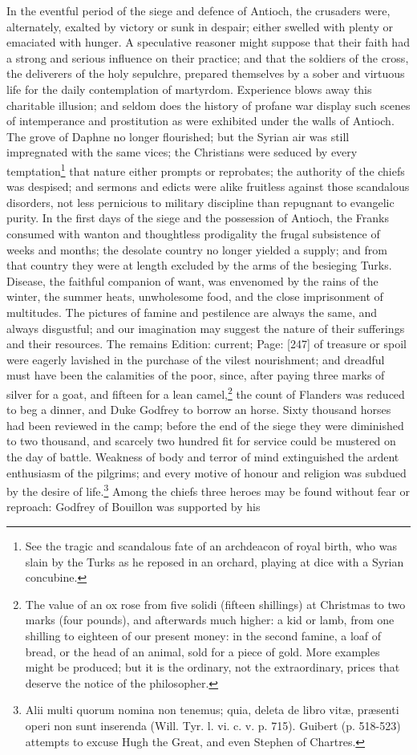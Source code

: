 In the eventful period of the siege and defence of Antioch, the crusaders were, alternately, exalted by victory or sunk in despair; either swelled with plenty or emaciated with hunger. A speculative reasoner might suppose that their faith had a strong and serious influence on their practice; and that the soldiers of the cross, the deliverers of the holy sepulchre, prepared themselves by a sober and virtuous life for the daily contemplation of martyrdom. Experience blows away this charitable illusion; and seldom does the history of profane war display such scenes of intemperance and prostitution as were exhibited under the walls of Antioch. The grove of Daphne no longer flourished; but the Syrian air was still impregnated with the same vices; the Christians were seduced by every temptation\footnote{See the tragic and scandalous fate of an archdeacon of royal birth, who was slain by the Turks as he reposed in an orchard, playing at dice with a Syrian concubine.} that nature either prompts or reprobates; the authority of the chiefs was despised; and sermons and edicts were alike fruitless against those scandalous disorders, not less pernicious to military discipline than repugnant to evangelic purity. In the first days of the siege and the possession of Antioch, the Franks consumed with wanton and thoughtless prodigality the frugal subsistence of weeks and months; the desolate country no longer yielded a supply; and from that country they were at length excluded by the arms of the besieging Turks. Disease, the faithful companion of want, was envenomed by the rains of the winter, the summer heats, unwholesome food, and the close imprisonment of multitudes. The pictures of famine and pestilence are always the same, and always disgustful; and our imagination may suggest the nature of their sufferings and their resources. The remains Edition: current; Page: [247] of treasure or spoil were eagerly lavished in the purchase of the vilest nourishment; and dreadful must have been the calamities of the poor, since, after paying three marks of silver for a goat, and fifteen for a lean camel,\footnote{The value of an ox rose from five solidi (fifteen shillings) at Christmas to two marks (four pounds), and afterwards much higher: a kid or lamb, from one shilling to eighteen of our present money: in the second famine, a loaf of bread, or the head of an animal, sold for a piece of gold. More examples might be produced; but it is the ordinary, not the extraordinary, prices that deserve the notice of the philosopher.} the count of Flanders was reduced to beg a dinner, and Duke Godfrey to borrow an horse. Sixty thousand horses had been reviewed in the camp; before the end of the siege they were diminished to two thousand, and scarcely two hundred fit for service could be mustered on the day of battle. Weakness of body and terror of mind extinguished the ardent enthusiasm of the pilgrims; and every motive of honour and religion was subdued by the desire of life.\footnote{Alii multi quorum nomina non tenemus; quia, deleta de libro vitæ, præsenti operi non sunt inserenda (Will. Tyr. l. vi. c. v. p. 715). Guibert (p. 518-523) attempts to excuse Hugh the Great, and even Stephen of Chartres.} Among the chiefs three heroes may be found without fear or reproach: Godfrey of Bouillon was supported by his 
